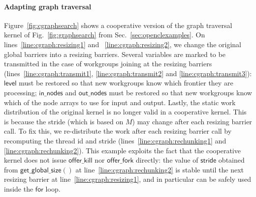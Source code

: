 \documentclass[numbers,nocopyrightspace,10pt]{sigplanconf}
\newcommand{\myfig}{Fig.~}
\newcommand{\myfiglong}{Figure~}
\newcommand{\mysec}{Sec.~}
\newcommand{\offerfork}{\mathsf{offer\_fork}}
\newcommand{\offerkill}{\mathsf{offer\_kill}}
\newcommand{\getglobalsize}{\mathsf{get\_global\_size}}
\newcommand{\keyword}[1]{\mathsf{#1}}
\begin{document}

\paragraph{Adapting graph traversal} 
\myfiglong\ref{fig:cgraphsearch} shows a cooperative version of the
graph traversal kernel of \myfig\ref{fig:graphsearch} from
\mysec\ref{sec:openclexamples}.  On lines~\ref{line:cgraph:resizing1}
and ~\ref{line:cgraph:resizing2}, we change the original global
barriers into a resizing barriers. Several variables are marked to be
transmitted in the case of workgroups joining at the resizing barriers
(lines~\ref{line:cgraph:transmit1}, \ref{line:cgraph:transmit2} and
\ref{line:cgraph:transmit3}): $\keyword{level}$ must be restored so
that new workgroups know which frontier they are processing;
$\keyword{in\_nodes}$ and $\keyword{out\_nodes}$ must be restored so
that new workgroups know which of the node arrays to use for input and
output. Lastly, the static work distribution of the original kernel is
no longer valid in a cooperative kernel. This is because the stride
(which is based on $M$) may change after each resizing barrier
call. To fix this, we re-distribute the work after each resizing
barrier call by recomputing the thread id and stride
(lines~\ref{line:cgraph:rechunking1} and
\ref{line:cgraph:rechunking2}). This example exploits the fact that
the cooperative kernel does not issue $\offerkill$ nor $\offerfork$
directly: the value of $\keyword{stride}$ obtained from
$\getglobalsize()$ at line~\ref{line:cgraph:rechunking2} is stable
until the next resizing barrier at line~\ref{line:cgraph:resizing1},
and in particular can be safely used inside the $\keyword{for}$ loop.
\end{document}
